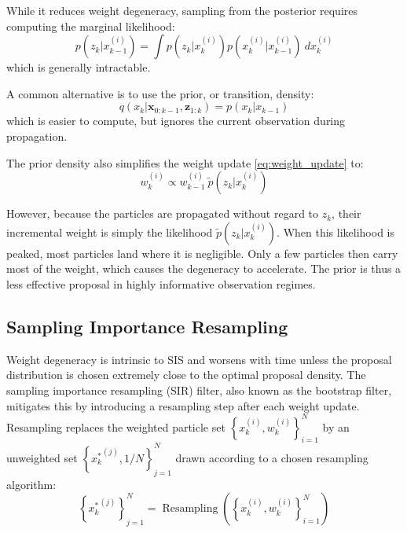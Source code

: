 While it reduces weight degeneracy, sampling from the posterior requires computing the marginal likelihood:
\begin{equation}
	p\left(z_k|x_{k-1}^{(i)}\right)=\int{p\left(z_k|x_k^{(i)}\right)p\left(x_k^{(i)}|x_{k-1}^{(i)}\right)\:dx_k^{(i)}}
\end{equation}
which is generally intractable.

A common alternative is to use the prior, or transition, density:
\begin{equation}
	q(x_k|\mathbf{x}_{0:k-1},\mathbf{z}_{1:k})=p(x_k|x_{k-1})\label{eq:prior_proposal}
\end{equation}
which is easier to compute, but ignores the current observation during propagation.

The prior density also simplifies the weight update \eqref{eq:weight_update} to:
\begin{equation}
	w_k^{(i)}\propto w_{k-1}^{(i)}\:\tilde{p}\left(z_k|x_k^{(i)}\right)\label{eq:weight_update_prior}
\end{equation}

However, because the particles are propagated without regard to $z_k$, their incremental weight is simply the likelihood $\tilde{p}\left(z_k|x_k^{(i)}\right)$. When this likelihood is peaked, most particles land where it is negligible. Only a few particles then carry most of the weight, which causes the degeneracy to accelerate. The prior is thus a less effective proposal in highly informative observation regimes.

\subsection{Sampling Importance Resampling}

Weight degeneracy is intrinsic to SIS and worsens with time unless the proposal distribution is chosen extremely close to the optimal proposal density. The sampling importance resampling (SIR) filter, also known as the bootstrap filter, mitigates this by introducing a resampling step after each weight update. Resampling replaces the weighted particle set $\left\{x_k^{(i)},w_k^{(i)}\right\}_{i=1}^N$ by an unweighted set $\left\{{x_k^*}^{(j)},1/N\right\}_{j=1}^N$ drawn according to a chosen resampling algorithm:
\begin{equation}
	\left\{{x^*_k}^{(j)}\right\}_{j=1}^N=\operatorname{Resampling}\left(\left\{x_k^{(i)},w_k^{(i)}\right\}_{i=1}^N\right)\label{eq:resampling}
\end{equation}


